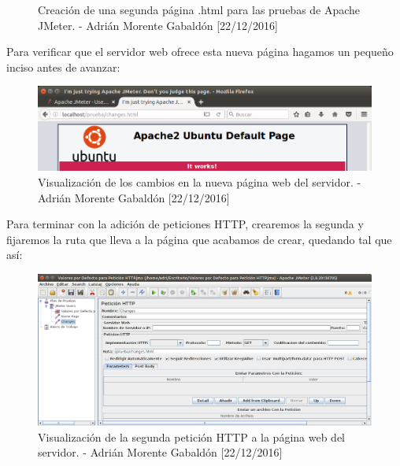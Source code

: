 \begin{enumerate}
\begin{figure}[H]
			\caption{Creación de una segunda página .html para las pruebas de Apache JMeter. - Adrián Morente Gabaldón [22/12/2016]}
			\label{figura11}
		\end{figure}
		Para verificar que el servidor web ofrece esta nueva página hagamos un pequeño inciso antes de avanzar:
		\begin{figure}[H]
			\centering
			\includegraphics[scale=0.4]{jmeter-newpage}
			\caption{Visualización de los cambios en la nueva página web del servidor. - Adrián Morente Gabaldón [22/12/2016]}
			\label{figura12}
		\end{figure}
		Para terminar con la adición de peticiones HTTP, crearemos la segunda y fijaremos la ruta que lleva a la página que acabamos de crear, quedando tal que así:
		\begin{figure}[H]
			\centering
			\includegraphics[scale=0.4]{jmeter-lasthttp}
			\caption{Visualización de la segunda petición HTTP a la página web del servidor. - Adrián Morente Gabaldón [22/12/2016]}
			\label{figura13}
		\end{figure}
	

\end{enumerate}

